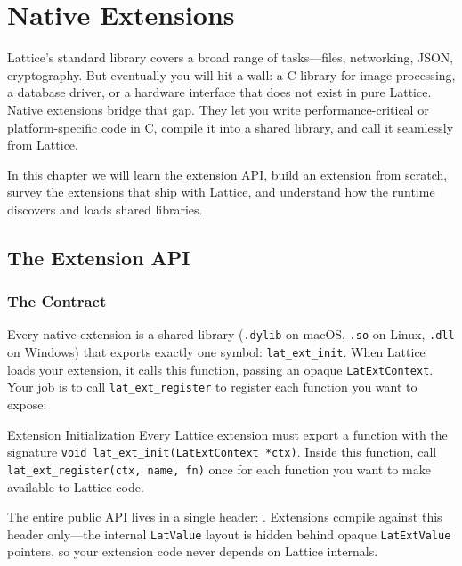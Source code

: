 \chapter{Native Extensions}\label{ch:native-extensions}


Lattice's standard library covers a broad range of tasks---files, networking, JSON, cryptography.
But eventually you will hit a wall: a C library for image processing, a database driver, or a hardware interface that does not exist in pure Lattice.
Native extensions bridge that gap.
They let you write performance-critical or platform-specific code in C, compile it into a shared library, and call it seamlessly from Lattice.

In this chapter we will learn the extension API, build an extension from scratch, survey the extensions that ship with Lattice, and understand how the runtime discovers and loads shared libraries.

\section{The Extension API}\label{sec:ext-api}

\subsection{The Contract}

Every native extension is a shared library (\lstinline|.dylib| on macOS, \lstinline|.so| on Linux, \lstinline|.dll| on Windows) that exports exactly one symbol: \lstinline|lat_ext_init|.
When Lattice loads your extension, it calls this function, passing an opaque \lstinline|LatExtContext|.
Your job is to call \lstinline|lat_ext_register| to register each function you want to expose:

\begin{defnbox}{Extension Initialization}
Every Lattice extension must export a function with the signature
\lstinline|void lat_ext_init(LatExtContext *ctx)|.
Inside this function, call \lstinline|lat_ext_register(ctx, name, fn)| once for each function you want to make available to Lattice code.
\end{defnbox}

The entire public API lives in a single header: .
Extensions compile against this header only---the internal \lstinline|LatValue| layout is hidden behind opaque \lstinline|LatExtValue| pointers, so your extension code never depends on Lattice internals.

